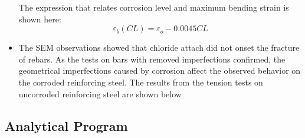 \begin{itemize}
    The expression that relates corrosion level and maximum bending strain is shown here:
    \begin{equation}
        \varepsilon_{b}(CL) = \varepsilon_{o}-0.0045CL
        \label{eq.Calderon_eb_vs_CL_ch7}
    \end{equation}
    
    \item The SEM observations showed that chloride attach did not onset the fracture of rebars. As the tests on bars with removed imperfections confirmed, the geometrical imperfections caused by corrosion affect the observed behavior on the corroded reinforcing steel. The results from the tension tests on uncorroded reinforcing steel are shown below
\end{itemize}
\subsection{Analytical Program}
